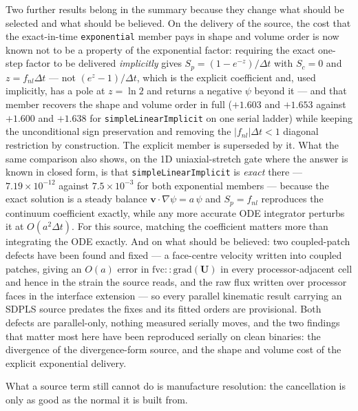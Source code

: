 \documentclass[preprint,3p,11pt]{elsarticle}
\newcommand{\psilev}{\psi}
\begin{document}
Two further results belong in the summary because they change what should be
selected and what should be believed. On the delivery of the source, the cost that
the exact-in-time \texttt{exponential} member pays in shape and volume order is
now known not to be a property of the exponential factor: requiring the exact
one-step factor to be delivered \emph{implicitly} gives
$S_p = (1 - e^{-z})/\Delta t$ with $S_c = 0$ and $z = f_{nl}\Delta t$ --- not
$(e^{z}-1)/\Delta t$, which is the explicit coefficient and, used implicitly, has a
pole at $z = \ln 2$ and returns a negative $\psilev$ beyond it --- and that member
recovers the shape and volume order in full ($+1.603$ and $+1.653$ against
$+1.600$ and $+1.638$ for \texttt{simpleLinearImplicit} on one serial ladder) while
keeping the unconditional sign preservation and removing the
$|f_{nl}|\Delta t < 1$ diagonal restriction by construction. The explicit member is
superseded by it. What the same comparison also shows, on the 1D uniaxial-stretch
gate where the answer is known in closed form, is that
\texttt{simpleLinearImplicit} is \emph{exact} there --- $7.19\times10^{-12}$
against $7.5\times10^{-3}$ for both exponential members --- because the exact
solution is a steady balance $\mathbf{v}\cdot\nabla\psilev = a\,\psilev$ and
$S_p = f_{nl}$ reproduces the continuum coefficient exactly, while any more
accurate ODE integrator perturbs it at $O(a^2\Delta t)$. For this source, matching
the coefficient matters more than integrating the ODE exactly. And on what should
be believed: two coupled-patch defects have been found and fixed --- a face-centre
velocity written into coupled patches, giving an $O(a)$ error in
$\mathrm{fvc::grad}(\mathbf{U})$ in every processor-adjacent cell and hence in the
strain the source reads, and the raw flux written over processor faces in the
interface extension --- so every parallel kinematic result carrying an SDPLS source
predates the fixes and its fitted orders are provisional. Both defects are
parallel-only, nothing measured serially moves, and the two findings that matter most here have
been reproduced serially on clean binaries: the divergence of the divergence-form
source, and the shape and volume cost of the explicit exponential delivery.

What a source term still cannot do is manufacture resolution: the cancellation
is only as good as the normal it is built from.
\end{document}
